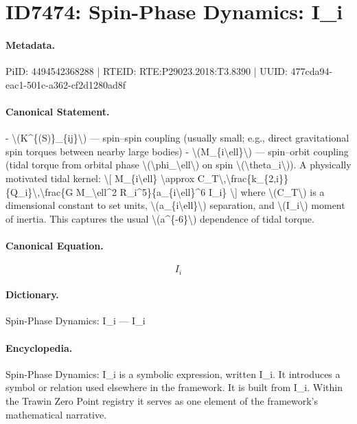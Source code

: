 \section*{ID7474: Spin-Phase Dynamics: I\_i}
\paragraph{Metadata.}
PiID: 4494542368288 | RTEID: RTE:P29023.2018:T3.8390 | UUID: 477cda94-eac1-501c-a362-cf2d1280ad8f

\paragraph{Canonical Statement.}
- \textbackslash{}(K\textasciicircum{}\{(S)\}\_\{ij\}\textbackslash{}) — spin–spin coupling (usually small; e.g., direct gravitational spin torques between nearby large bodies) - \textbackslash{}(M\_\{i\textbackslash{}ell\}\textbackslash{}) — spin–orbit coupling (tidal torque from orbital phase \textbackslash{}(\textbackslash{}phi\_\textbackslash{}ell\textbackslash{}) on spin \textbackslash{}(\textbackslash{}theta\_i\textbackslash{})). A physically motivated tidal kernel: \textbackslash{}[ M\_\{i\textbackslash{}ell\} \textbackslash{}approx C\_T\textbackslash{},\textbackslash{}frac\{k\_\{2,i\}\}\{Q\_i\}\textbackslash{},\textbackslash{}frac\{G M\_\textbackslash{}ell\textasciicircum{}2 R\_i\textasciicircum{}5\}\{a\_\{i\textbackslash{}ell\}\textasciicircum{}6 I\_i\} \textbackslash{}] where \textbackslash{}(C\_T\textbackslash{}) is a dimensional constant to set units, \textbackslash{}(a\_\{i\textbackslash{}ell\}\textbackslash{}) separation, and \textbackslash{}(I\_i\textbackslash{}) moment of inertia. This captures the usual \textbackslash{}(a\textasciicircum{}\{-6\}\textbackslash{}) dependence of tidal torque.

\paragraph{Canonical Equation.}
\[
I_i
\]

\paragraph{Dictionary.}
Spin-Phase Dynamics: I\_i — I\_i

\paragraph{Encyclopedia.}
Spin-Phase Dynamics: I\_i is a symbolic expression, written I\_i. It introduces a symbol or relation used elsewhere in the framework. It is built from I\_i. Within the Trawin Zero Point registry it serves as one element of the framework's mathematical narrative.
